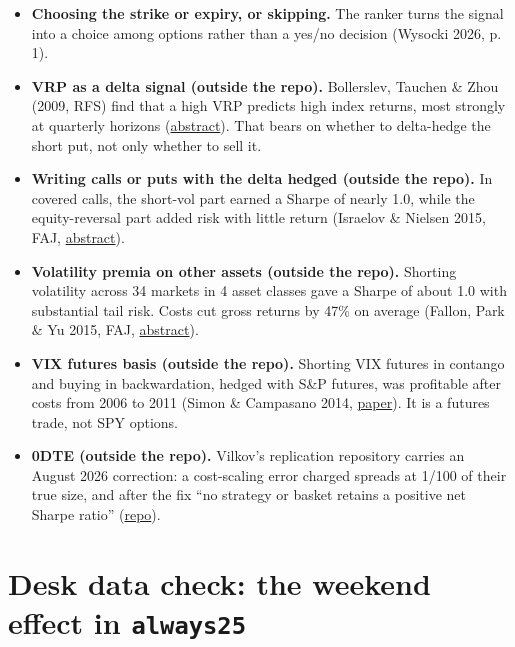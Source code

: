 \documentclass{article}
\begin{document}
\begin{itemize}

\item \textbf{Choosing the strike or expiry, or skipping.} The ranker turns the signal into a choice among options rather than a yes/\allowbreak{}no decision (Wysocki 2026, p. 1).

\item \textbf{VRP as a delta signal (outside the repo).} Bollerslev, Tauchen \& Zhou (2009, RFS) find that a high VRP predicts high index returns, most strongly at quarterly horizons (\href{https://econpapers.repec.org/RePEc:oup:rfinst:v:22:y:2009:i:11:p:4463-4492}{abstract}). That bears on whether to delta-hedge the short put, not only whether to sell it.

\item \textbf{Writing calls or puts with the delta hedged (outside the repo).} In covered calls, the short-vol part earned a Sharpe of nearly 1.0, while the equity-reversal part added risk with little return (Israelov \& Nielsen 2015, FAJ, \href{https://ideas.repec.org/a/taf/ufajxx/v71y2015i6p44-57.html}{abstract}).

\item \textbf{Volatility premia on other assets (outside the repo).} Shorting volatility across 34 markets in 4 asset classes gave a Sharpe of about 1.0 with substantial tail risk. Costs cut gross returns by 47\% on average (Fallon, Park \& Yu 2015, FAJ, \href{https://ideas.repec.org/a/taf/ufajxx/v71y2015i5p38-56.html}{abstract}).

\item \textbf{VIX futures basis (outside the repo).} Shorting VIX futures in contango and buying in backwardation, hedged with S\&P futures, was profitable after costs from 2006 to 2011 (Simon \& Campasano 2014, \href{https://www.efmaefm.org/0EFMAMEETINGS/EFMA\%20ANNUAL\%20MEETINGS/2013-Reading/papers/VIX\%20paper_EFMA.pdf}{paper}). It is a futures trade, not SPY options.

\item \textbf{0DTE (outside the repo).} Vilkov's replication repository carries an August 2026 correction: a cost-scaling error charged spreads at 1/\allowbreak{}100 of their true size, and after the fix ``no strategy or basket retains a positive net Sharpe ratio'' (\href{https://github.com/vilkovgr/0dte-strategies}{repo}).

\end{itemize}

\section{Desk data check: the weekend effect in \texttt{always25}}
\end{document}
